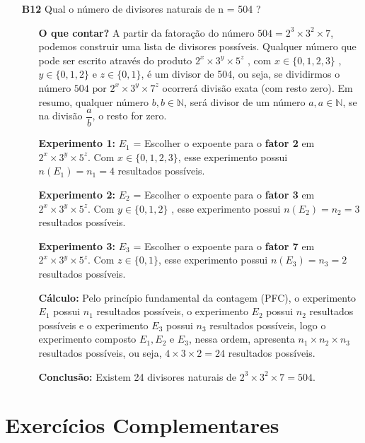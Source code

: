 \documentclass[a4paper,12pt]{article}
\begin{document}
\begin{enumerate}
\item[\textbf{B12}] Qual o número de divisores naturais de n = 504 ?
  \begin{itemize}
    \item[\ding{172}] \textbf{O que contar?} A partir da fatoração do número $ 504 = 2^3 \times 3^2 \times 7$, podemos construir uma lista de divisores possíveis. Qualquer número que pode ser escrito através do produto $2^x \times 3^y \times 5^z$ , com $x \in \{0,1,2,3\}$ , $y \in \{0,1,2\}$ e $z \in \{0,1\}$, é um divisor de 504, ou seja, se dividirmos o número $504 \textrm{ por } 2^x \times 3^y \times 7^z$ ocorrerá divisão exata (com resto zero). Em resumo, qualquer número $b, b \in \mathbb{N}$, será divisor de um número $a, a \in \mathbb{N}$, se na divisão $\dfrac{a}{b}$, o resto for zero.
    \item[\ding{173}] \textbf{Experimento 1:} $E_1$ = Escolher o expoente para o \textbf{fator 2} em $2^x \times 3^y \times 5^z$. Com $x \in \{0,1,2,3\}$, esse experimento possui $n(E_1) = n_1 = 4$ resultados possíveis.
    \item[\ding{174}] \textbf{Experimento 2:} $E_2$ = Escolher o expoente para o \textbf{fator 3} em $2^x \times 3^y \times 5^z$. Com $y \in \{0,1,2\}$ , esse experimento possui $n(E_2) = n_2 = 3$ resultados possíveis.
    \item[\ding{175}] \textbf{Experimento 3:} $E_3$ = Escolher o expoente para o \textbf{fator 7} em $2^x \times 3^y \times 5^z$. Com $z \in \{0,1\}$, esse experimento possui $n(E_3) = n_3 = 2$ resultados possíveis.
    \item[\ding{176}] \textbf{Cálculo:} Pelo princípio fundamental da contagem (PFC), o experimento $E_1$ possui $n_1$ resultados possíveis, o experimento $E_2$ possui $n_2$ resultados possíveis e o experimento $E_3$ possui $n_3$ resultados possíveis, logo o experimento composto $E_1, E_2 \textrm{ e } E_3$, nessa ordem, apresenta $n_1 \times n_2 \times n_3$ resultados possíveis, ou seja, $4 \times 3 \times 2 = 24$ resultados possíveis.
    \item[\ding{177}] \textbf{Conclusão:} Existem 24 divisores naturais de $2^3 \times 3^2 \times 7 = 504$.  
  \end{itemize}   

\end{enumerate} %

\section{Exercícios Complementares}
\end{document}
